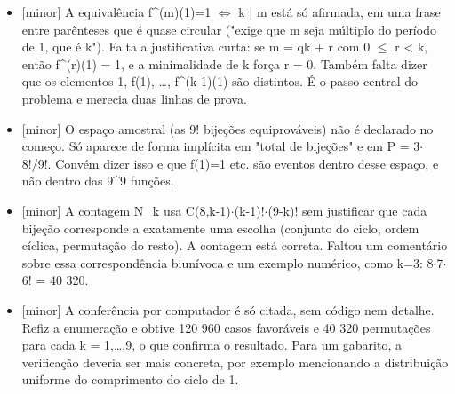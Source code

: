 \documentclass{article}%
\begin{document}
\begin{itemize}%
\item%
{[}minor{]} A equivalência f\^{}(m)(1)=1 $\Leftrightarrow$ k | m está só afirmada, em uma frase entre parênteses que é quase circular ("exige que m seja múltiplo do período de 1, que é k"). Falta a justificativa curta: se m = qk + r com 0 $\leq$ r < k, então f\^{}(r)(1) = 1, e a minimalidade de k força r = 0. Também falta dizer que os elementos 1, f(1), \ldots{}, f\^{}(k-1)(1) são distintos. É o passo central do problema e merecia duas linhas de prova.%
\item%
{[}minor{]} O espaço amostral (as 9! bijeções equiprováveis) não é declarado no começo. Só aparece de forma implícita em "total de bijeções" e em P = 3$\cdot$8!/9!. Convém dizer isso e que f(1)=1 etc. são eventos dentro desse espaço, e não dentro das 9\^{}9 funções.%
\item%
{[}minor{]} A contagem N\_k usa C(8,k-1)$\cdot$(k-1)!$\cdot$(9-k)! sem justificar que cada bijeção corresponde a exatamente uma escolha (conjunto do ciclo, ordem cíclica, permutação do resto). A contagem está correta. Faltou um comentário sobre essa correspondência biunívoca e um exemplo numérico, como k=3: 8$\cdot$7$\cdot$6! = 40 320.%
\item%
{[}minor{]} A conferência por computador é só citada, sem código nem detalhe. Refiz a enumeração e obtive 120 960 casos favoráveis e 40 320 permutações para cada k = 1,\ldots{},9, o que confirma o resultado. Para um gabarito, a verificação deveria ser mais concreta, por exemplo mencionando a distribuição uniforme do comprimento do ciclo de 1.%
\end{itemize}%
\end{document}
